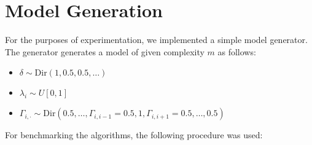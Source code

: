 \section{Model Generation}
For the purposes of experimentation, we implemented a simple model generator. The generator generates a model of given complexity $m$ as follows:
\begin{itemize}
	\item $\delta \sim \text{Dir}(1, 0.5, 0.5, \dots )$
	\item $\lambda_i \sim U[0, 1]$
	\item $\Gamma_{i, \cdot} \sim \text{Dir}(0.5, \dots, \Gamma_{i, i-1} = 0.5, 1, \Gamma_{i, i+1} = 0.5, \dots, 0.5)$
\end{itemize}

For benchmarking the algorithms, the following procedure was used:
